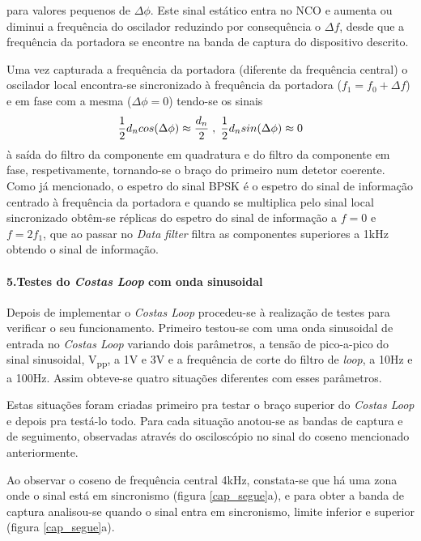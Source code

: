 \documentclass[11pt]{article}
\numberwithin{equation}{section}
\begin{document}
para valores pequenos de $\Delta\phi$. Este sinal estático entra no NCO e aumenta ou diminui a frequência do oscilador reduzindo por consequência o $\Delta f$, desde que a frequência da portadora se encontre na banda de captura do dispositivo descrito.

Uma vez capturada a frequência da portadora (diferente da frequência central) o oscilador local encontra-se sincronizado à frequência da portadora ($f_1 = f_0+\Delta f$) e em fase com a mesma ($\Delta\phi=0$) tendo-se os sinais
\begin{equation}
\frac{1}{2}d_ncos(\Delta\phi)\approx\dfrac{d_n}{2} \hspace{1mm}, \hspace{1mm} \frac{1}{2}d_nsin(\Delta\phi)\approx 0
\end{equation}
à saída do filtro da componente em quadratura e do filtro da componente em fase, respetivamente, tornando-se o braço do primeiro num detetor coerente. Como já mencionado, o espetro do sinal BPSK é o espetro do sinal de informação centrado à frequência da portadora e quando se multiplica pelo sinal local sincronizado obtêm-se réplicas do espetro do sinal de informação a $f=0$ e $f=2f_1$, que ao passar no \textit{Data filter} filtra as componentes superiores a 1kHz obtendo o sinal de informação.


\paragraph{5.Testes do \textit{Costas Loop} com onda sinusoidal} \hspace{0pt} \label{para:P3-5}

Depois de implementar o \textit{Costas Loop} procedeu-se à realização de testes para verificar o seu funcionamento. Primeiro testou-se com uma onda sinusoidal de entrada no \textit{Costas Loop} variando dois parâmetros, a  tensão de pico-a-pico do sinal sinusoidal, V\textsubscript{pp}, a 1V e 3V e a frequência de corte do filtro de \textit{loop}, a 10Hz e a 100Hz. Assim obteve-se quatro situações diferentes com esses parâmetros.

 Estas situações foram criadas primeiro pra testar o braço superior do \textit{Costas Loop} e depois pra testá-lo todo. Para cada situação anotou-se as bandas de captura e de seguimento, observadas através do osciloscópio no sinal do coseno mencionado anteriormente. 
 
 Ao observar o coseno de frequência central 4kHz, constata-se que há uma zona onde o sinal está em sincronismo (figura \ref{cap_segue}a), e para obter a banda de captura analisou-se quando o sinal entra em sincronismo, limite inferior e superior (figura \ref{cap_segue}a).
 
\end{document}
